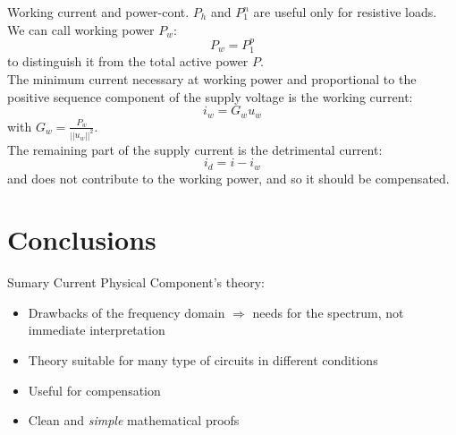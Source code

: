 \documentclass[aspectratio=169]{beamer}
\begin{document}
  \begin{frame}{Working current and power-cont.}{\insertsection}
    $P_h$ and $P_1^n$ are useful only for resistive loads. \\
    We can call \textcolor{NTNU_orange}{working power $P_w$}:
    \begin{equation}
      P_w = P_{1}^{p} 
    \end{equation}  
    to distinguish it from the total \textcolor{NTNU_green}{active power $P$}.\\
    The minimum current necessary at working power and proportional to the positive sequence component of the supply voltage is the \textcolor{NTNU_orange}{working current}:
    \begin{equation}
      \pmb{\mathit{i}}_w = G_w \pmb{\mathit{u}}_w
    \end{equation}
    with $G_w=\frac{P_w}{||\pmb{\mathit{u}}_w||^2}$.\\
    The remaining part of the supply current is the \textcolor{NTNU_orange}{detrimental current}:
    \begin{equation}
      \pmb{\mathit{i}}_d = \pmb{\mathit{i}} - \pmb{\mathit{i}}_w
    \end{equation}
    and does not contribute to the working power, and so it should be compensated.
  \end{frame}


    \section{Conclusions}
    \begin{frame}{Sumary}
    Current Physical Component's theory:
        \begin{itemize}
            \item Drawbacks of the frequency domain $\Rightarrow$ needs for the spectrum, not immediate interpretation
            \item Theory suitable for many type of circuits in different conditions
            \item Useful for compensation
            \item Clean and \textit{simple} mathematical proofs
        \end{itemize}
    \end{frame}
\end{document}
